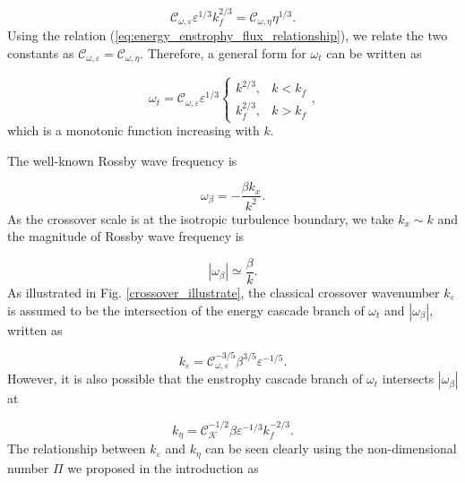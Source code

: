 \documentclass{ametsoc}
\begin{document}
\[
\mathcal{C}_{\omega,\varepsilon}\varepsilon^{1/3}k_{f}^{2/3}=\mathcal{C}_{\omega,\eta}\eta^{1/3}.
\]
Using the relation (\ref{eq:energy_enstrophy_flux_relationship}),
we relate the two constants as $\mathcal{C}_{\omega,\varepsilon}=\mathcal{C}_{\omega,\eta}$.
Therefore, a general form for $\omega_{t}$ can be written as

\begin{equation}
\omega_{t}=\mathcal{C}_{\omega,\varepsilon}\varepsilon^{1/3}\begin{cases}
k^{2/3}, & k<k_{f}\\
k_{f}^{2/3}, & k>k_{f}
\end{cases},\label{eq:eddy_turnover_freq_general_form}
\end{equation}
which is a monotonic function increasing with $k$.

The well-known Rossby wave frequency is 

\begin{equation}
\omega_{\beta}=-\frac{\beta k_{x}}{k^{2}}.\label{eq:Rossby_wave_freq_kx_k}
\end{equation}
As the crossover scale is at the isotropic turbulence boundary, we
take $k_{x}\sim k$ and the magnitude of Rossby wave frequency is

\begin{equation}
|\omega_{\beta}|\simeq\frac{\beta}{k}.\label{eq:Rossby_wave_freq_k}
\end{equation}
As illustrated in Fig. \ref{crossover_illustrate}, the classical
crossover wavenumber $k_{\varepsilon}$ is assumed to be the intersection
of the energy cascade branch of $\omega_{t}$ and $|\omega_{\beta}|$,
written as

\begin{equation}
k_{\varepsilon}=\mathcal{C}_{\omega,\varepsilon}^{-3/5}\beta^{3/5}\varepsilon^{-1/5}.\label{eq:crossover_k_energy_branch}
\end{equation}
However, it is also possible that the enstrophy cascade branch of
$\omega_{t}$ intersects $|\omega_{\beta}|$ at

\begin{equation}
k_{\eta}=\mathcal{C}_{\mathcal{K}}^{-1/2}\beta\varepsilon^{-1/3}k_{f}^{-2/3}.\label{eq:crossover_k_enstrophy_branch}
\end{equation}
The relationship between $k_{\varepsilon}$ and $k_{\eta}$ can be
seen clearly using the non-dimensional number $\Pi$ we proposed in
the introduction as
\end{document}
